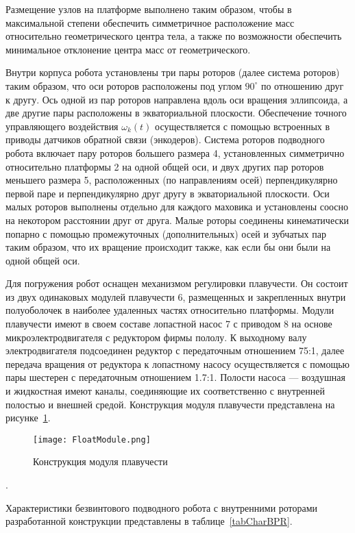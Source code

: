 Размещение узлов на платформе выполнено таким образом, чтобы в максимальной степени обеспечить симметричное расположение масс относительно геометрического центра тела, а также по возможности обеспечить минимальное отклонение центра масс от геометрического.

Внутри корпуса робота установлены три пары роторов (далее система роторов) таким образом, что оси роторов расположены под углом $90^\circ$ по отношению друг к другу. Ось одной из пар роторов направлена вдоль оси вращения эллипсоида, а две другие пары расположены в экваториальной плоскости. Обеспечение точного управляющего воздействия $\omega_k (t)$ осуществляется с помощью встроенных в приводы датчиков обратной связи (энкодеров). Система роторов подводного робота включает пару роторов большего размера 4, установленных симметрично относительно платформы 2 на одной общей оси, и двух других пар роторов меньшего размера 5, расположенных (по направлениям осей) перпендикулярно первой паре и перпендикулярно друг другу в экваториальной плоскости. Оси малых роторов выполнены отдельно для каждого маховика и установлены соосно на некотором расстоянии друг от друга. Малые роторы соединены кинематически попарно с помощью промежуточных (дополнительных) осей и зубчатых пар таким образом, что их вращение происходит также, как если бы они были на одной общей оси.

Для погружения робот оснащен механизмом регулировки плавучести. Он состоит из двух одинаковых модулей плавучести 6, размещенных и закрепленных внутри полуоболочек в наиболее удаленных частях относительно платформы. Модули плавучести имеют в своем составе лопастной насос 7 с приводом 8 на основе микроэлектродвигателя с редуктором фирмы пололу. К выходному валу электродвигателя подсоединен редуктор с передаточным отношением 75:1, далее передача вращения от редуктора к лопастному насосу осуществляется с помощью пары шестерен с передаточным отношением 1.7:1. Полости насоса --- воздушная и жидкостная имеют каналы, соединяющие их соответственно с внутренней полостью и внешней средой. Конструкция модуля плавучести представлена на рисунке~\ref{FloatModule}.

\begin{figure}[h]
	\centering
	\texttt{[image: FloatModule.png]}%
	\caption{Конструкция модуля плавучести}
	\label{FloatModule}
\end{figure}

.

Характеристики безвинтового подводного робота с внутренними роторами разработанной конструкции представлены в таблице~\ref{tabCharBPR}.

